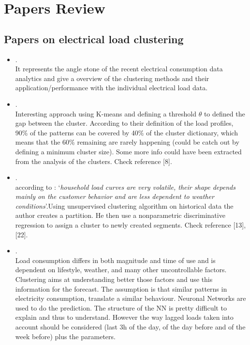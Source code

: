\section{Papers Review}
\subsection{Papers on electrical load clustering}

\begin{itemize}
	\item {}.\\
	 It represents the angle stone of the recent electrical consumption data analytics and give a overview of the clustering methods and their application/performance with the individual electrical load data.
	\item {}.\\
	 Interesting approach using K-means and defining a threshold $\theta$ to defined the gap between the cluster. According to their definition of the load profiles, 90\% of the patterns can be covered by 40\% of the cluster dictionary, which means that the 60\% remaining are rarely happening (could be catch out by defining a minimum cluster size). Some more info could have been extracted from the analysis of the clusters. Check reference [8].
	\item {}.\\
	 according to \citeauthor{chaouch2014}: `\emph{household load curves are very volatile, their shape depends mainly on the customer behavior and are less dependent to weather conditions}'.Using unsupervised clustering algorithm on historical data the author creates a partition. He then use a nonparametric discriminative regression to assign a cluster to  newly created segments. Check reference [13],[22].
	\item {}.\\
	 Load consumption differs in both magnitude and time of use and is dependent on lifestyle, weather, and many other uncontrollable factors. Clustering aims at understanding better those factors and use this information for the forecast. The assumption is that similar patterns in electricity consumption, translate a similar behaviour. Neuronal Networks are used to do the prediction. The structure of the NN is pretty difficult to explain and thus to understand. However the way lagged loads taken into account should be considered (last 3h of the day, of the day before and of the week before) plus the parameters.

\end{itemize}
